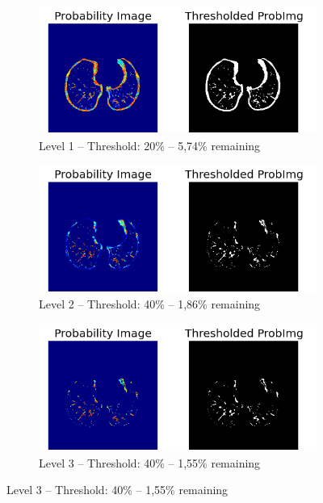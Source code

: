 \begin{figure}[p]
\begin{center}
	\begin{subfigure}[b]{\linewidth}
		\includegraphics[width=\linewidth]{img/cascades/D50S50L1.png}
		\caption{Level 1 -- Threshold: 20\% -- 5,74\% remaining}
	\end{subfigure}
	\begin{subfigure}[b]{\linewidth}
		\includegraphics[width=\linewidth]{img/cascades/D50S50L2.png}
		\caption{Level 2 -- Threshold: 40\% -- 1,86\% remaining}
	\end{subfigure}
	\begin{subfigure}[b]{\linewidth}
		\includegraphics[width=\linewidth]{img/cascades/D50S50L3.png}
		\caption{Level 3 -- Threshold: 40\% -- 1,55\% remaining}

\end{subfigure}
\end{center}
\end{figure}
